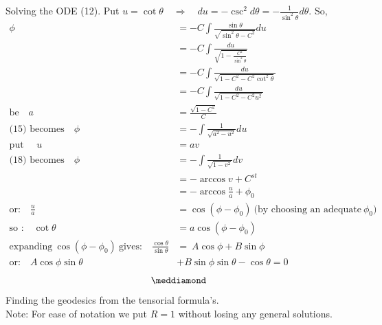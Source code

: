 Solving the ODE (12). Put $u = \cot \theta \quad \Rightarrow \quad du = - \csc^2 d\theta = -\frac{1}{\sin^2\theta} d\theta$. So,  
\begin{align}
\phi &= -C\int \frac{\sin \theta}{ \sqrt{\sin^2 \theta - C^2}}du\\
&= -C\int \frac{du}{ \sqrt{1- \frac{C^2 }{\sin^2 \theta}}}\\
&= -C\int \frac{du}{ \sqrt{1- C^2 - C^2 \cot^2 \theta}}\\
&= -C\int \frac{du}{ \sqrt{1- C^2 - C^2 u^2}}\\
\text{be}\quad a&= \frac{\sqrt{1-C^2}}{C}\\
\text{(15) becomes}\quad \phi &= -\int \frac{1}{ \sqrt{a^2 -  u^2}}du\\
\text{put }\quad u &= av\\
\text{(18) becomes}\quad \phi &= -\int \frac{1}{ \sqrt{1 -  v^2}}dv\\
\ &= -\arccos v + C^{st}\\
\ &= -\arccos \frac{u}{a}  + \phi_0\\
\text{or:}\quad \frac{u}{a} &= \cos (\phi - \phi_0)  \ \text{(by choosing an adequate}\ \phi_0\text{)}\\
\text{so :}\quad \cot\theta &= a \cos (\phi - \phi_0)  \\
\text{expanding} \  \cos (\phi - \phi_0)\  \text{gives:} \quad  \frac{\cos\theta}{\sin\theta} &= \ A\cos\phi + B\sin\phi\\
\text{or:} \quad  A\cos\phi \sin\theta &+ B\sin\phi\sin\theta -\cos\theta=0
\end{align}
$$\meddiamond$$
\newpage
Finding the geodesics from the tensorial formula's.\\
Note: For ease of notation we put $R=1$ without losing any general solutions.

